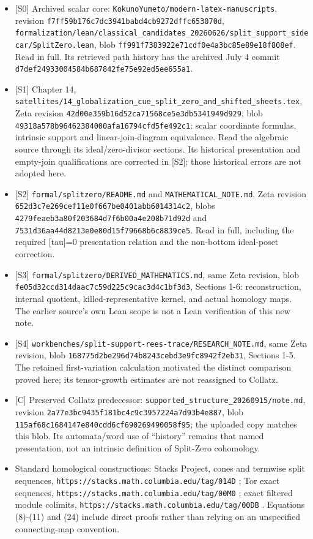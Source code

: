 \begin{itemize}
\tightlist
\item
  {[}S0{]} Archived scalar core:
  \nolinkurl{KokunoYumeto/modern-latex-manuscripts}, revision
  \nolinkurl{f7ff59b176c7dc3941babd4cb9272dffc653070d},
  \nolinkurl{formalization/lean/classical_candidates_20260626/split_support_sidecar/SplitZero.lean},
  blob \nolinkurl{ff991f7383922e71cdf0e4a3bc85e89e18f808ef}. Read in
  full. Its retrieved path history has the archived July 4 commit
  \nolinkurl{d7def24933004584b687842fe75e92ed5ee655a1}.
\item
  {[}S1{]} Chapter 14,
  \nolinkurl{satellites/14_globalization_cue_split_zero_and_shifted_sheets.tex},
  Zeta revision \nolinkurl{42d00e359b16d52ca71568ce5e3db5341949d929},
  blob \nolinkurl{49318a578b96462384000afa16794cfd5fe492c1}: scalar
  coordinate formulas, intrinsic support and linear-join-diagram
  equivalence. Read the algebraic source through its ideal/zero-divisor
  sections. Its historical presentation and empty-join qualifications
  are corrected in {[}S2{]}; those historical errors are not adopted
  here.
\item
  {[}S2{]} \nolinkurl{formal/splitzero/README.md} and
  \nolinkurl{MATHEMATICAL_NOTE.md}, Zeta revision
  \nolinkurl{652d3c7e269cef11e0f667be0401abb6014314c2}, blobs
  \nolinkurl{4279feaeb3a80f203684d7f6b00a4e208b71d92d} and
  \nolinkurl{7531d36aa44d8213e0e80d15f79668b6c8839ce5}. Read in full,
  including the required {[}tau{]}=0 presentation relation and the
  non-bottom ideal-poset correction.
\item
  {[}S3{]} \nolinkurl{formal/splitzero/DERIVED_MATHEMATICS.md}, same
  Zeta revision, blob
  \nolinkurl{fe05d32ccd314daac7c59d225c9cac3d4c1bf3d3}, Sections 1-6:
  reconstruction, internal quotient, killed-representative kernel, and
  actual homology maps. The earlier source's own Lean scope is not a
  Lean verification of this new note.
\item
  {[}S4{]}
  \nolinkurl{workbenches/split-support-rees-trace/RESEARCH_NOTE.md},
  same Zeta revision, blob
  \nolinkurl{168775d2be296d74b8243cebd3e9fc8942f2eb31}, Sections 1-5.
  The retained first-variation calculation motivated the distinct
  comparison proved here; its tensor-growth estimates are not reassigned
  to Collatz.
\item
  {[}C{]} Preserved Collatz predecessor:
  \nolinkurl{supported_structure_20260915/note.md}, revision
  \nolinkurl{2a77e3bc9435f181bc4c9c3957224a7d93b4e887}, blob
  \nolinkurl{115af68c1684147e840cdd6cf690269490058f95}; the uploaded
  copy matches this blob. Its automata/word use of ``history'' remains
  that named presentation, not an intrinsic definition of Split-Zero
  cohomology.
\item
  Standard homological constructions: Stacks Project, cones and termwise
  split sequences, \nolinkurl{https://stacks.math.columbia.edu/tag/014D}
  ; Tor exact sequences,
  \nolinkurl{https://stacks.math.columbia.edu/tag/00M0} ; exact filtered
  module colimits, \nolinkurl{https://stacks.math.columbia.edu/tag/00DB}
  . Equations (8)-(11) and (24) include direct proofs rather than
  relying on an unspecified connecting-map convention.
\end{itemize}

